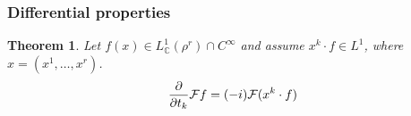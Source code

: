 \documentclass[11pt, a4paper, openany]{book}
\newtheorem{thm}{Theorem}\newtheorem{lem}{Lemma}\newtheorem{crl}{Corollary}
\theoremstyle{definition}
\newtheorem{define}{Definition}\newtheorem{exam}{Example}\newtheorem{remark}{Remark}
\newcommand{\cat}[1]{\textup{\textsf{#1}}}
\newenvironment{tight_enumerate}{\begin{enumerate}\itemsep -0.2em}{\end{enumerate}}
\begin{document}
\subsubsection{Differential properties}
    \begin{thm}
        Let $f(x)\in L^1_\mathbb{C}(\rho^r)\cap C^\infty$ and assume $x^k\cdot f\in L^1$, where $x=(x^1,\dots,x^r)$.
        \[
            \pdv{}{t_k}\mathcal{F}f=(-i)\mathcal{F}(x^k\cdot f)
        \]
    \end{thm}
\end{document}
